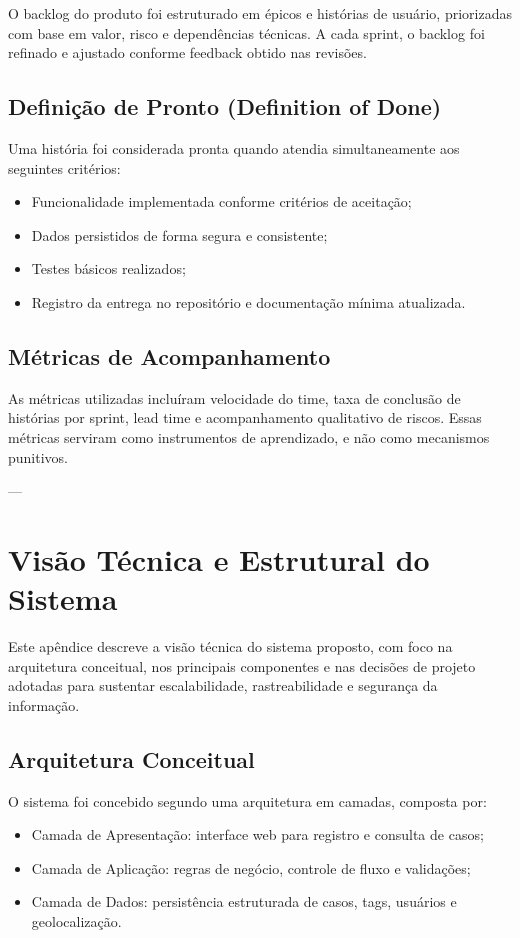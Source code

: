 O backlog do produto foi estruturado em épicos e histórias de usuário, priorizadas com base em valor, risco e dependências técnicas. A cada sprint, o backlog foi refinado e ajustado conforme feedback obtido nas revisões.

\section{Definição de Pronto (Definition of Done)}

Uma história foi considerada pronta quando atendia simultaneamente aos seguintes critérios:
\begin{itemize}
    \item Funcionalidade implementada conforme critérios de aceitação;
    \item Dados persistidos de forma segura e consistente;
    \item Testes básicos realizados;
    \item Registro da entrega no repositório e documentação mínima atualizada.
\end{itemize}

\section{Métricas de Acompanhamento}

As métricas utilizadas incluíram velocidade do time, taxa de conclusão de histórias por sprint, lead time e acompanhamento qualitativo de riscos. Essas métricas serviram como instrumentos de aprendizado, e não como mecanismos punitivos.

---

\chapter{Visão Técnica e Estrutural do Sistema}\label{apx:tecnico}

Este apêndice descreve a visão técnica do sistema proposto, com foco na arquitetura conceitual, nos principais componentes e nas decisões de projeto adotadas para sustentar escalabilidade, rastreabilidade e segurança da informação.

\section{Arquitetura Conceitual}

O sistema foi concebido segundo uma arquitetura em camadas, composta por:
\begin{itemize}
    \item Camada de Apresentação: interface web para registro e consulta de casos;
    \item Camada de Aplicação: regras de negócio, controle de fluxo e validações;
    \item Camada de Dados: persistência estruturada de casos, tags, usuários e geolocalização.
\end{itemize}

